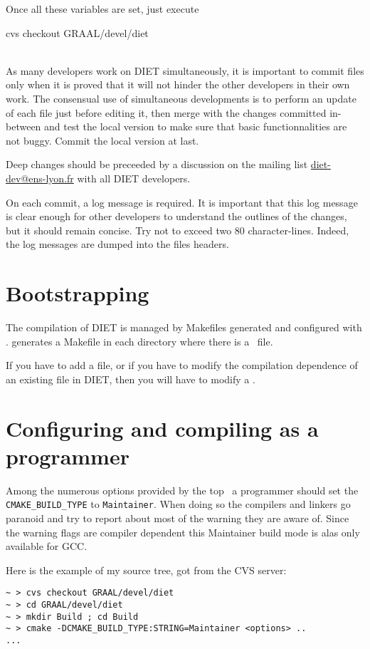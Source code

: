 Once all these variables are set, just execute\\
\centerline{\sf cvs checkout GRAAL/devel/diet}\\


As many developers work on DIET simultaneously, it is important to
commit files only when it is proved that it will not hinder the other
developers in their own work. The consensual use of simultaneous
developments is to perform an update of each file just before editing
it, then merge with the changes committed in-between and test the
local version to make sure that basic functionnalities are not
buggy. Commit the local version at last.

Deep changes should be preceeded by a discussion on the mailing list
\url{diet-dev@ens-lyon.fr} with all DIET developers.

On each commit, a log message is required. It is important that this
log message is clear enough for other developers to understand the
outlines of the changes, but it should remain concise. Try not to
exceed two 80 character-lines.  Indeed, the log messages are dumped
into the files headers.


\section{Bootstrapping}

The compilation of DIET is managed by Makefiles generated and
configured with \cmake.
\cmake generates a Makefile in each directory where there is a
\CMakeLists\ file.

If you have to add a file, or if you have to modify the compilation
dependence of an existing file in DIET, then you will have to modify a
\CMakeLists. 

\section{Configuring and compiling as a programmer}

Among the numerous options provided by the top \CMakeLists\ a
programmer should set the \verb+CMAKE_BUILD_TYPE+ to \verb+Maintainer+.
When doing so the compilers and linkers go paranoid and try to report
about most of the warning they are aware of.
Since the warning flags are compiler dependent this Maintainer build mode
is alas only available for GCC.

Here is the example of my source tree, got from the CVS server:
\begin{verbatim}
~ > cvs checkout GRAAL/devel/diet
~ > cd GRAAL/devel/diet
~ > mkdir Build ; cd Build
~ > cmake -DCMAKE_BUILD_TYPE:STRING=Maintainer <options> ..
...
\end{verbatim}

